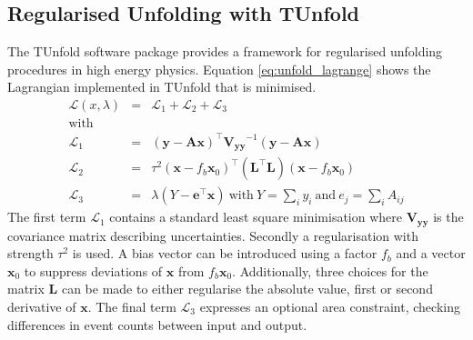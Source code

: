 \subsection{Regularised Unfolding with TUnfold}
	The TUnfold software package \cite{tunfold} provides a framework for regularised unfolding procedures in high energy physics. Equation \ref{eq:unfold_lagrange} shows the Lagrangian implemented in TUnfold that is minimised.
	\begin{eqnarray}
	\label{eq:unfold_lagrange}
	\mathcal{L}(x,\lambda) &=& \mathcal{L}_1 + \mathcal{L}_2 + \mathcal{L}_3 
	\\ \nonumber \text{with}
	\\ 
	\label{eq:unfold_lagrange1}
	\mathcal{L}_1 &=& (\mathbf{y} - \mathbf{Ax})^\intercal \mathbf{V_{yy}}^{-1} (\mathbf{y} - \mathbf{Ax}) 
	\\
	\label{eq:unfold_lagrange2}
	\mathcal{L}_2 &=& \tau^2 (\mathbf{x} - f_b \mathbf{x}_0)^\intercal (\mathbf{L}^\intercal \mathbf{L}) (\mathbf{x} - f_b \mathbf{x}_0) 
	\\
	\label{eq:unfold_lagrange3}
	\mathcal{L}_3 &=& \lambda (Y-\mathbf{e}^\intercal \mathbf{x}) \ \text{with} \ Y=\sum_{i} y_i \ \text{and} \ e_j = \sum_{i}A_{ij}
	\end{eqnarray}
	The first term $\mathcal{L}_1$ contains a standard least square minimisation where $\mathbf{V_{yy}}$ is the covariance matrix describing uncertainties. Secondly a regularisation with strength $\tau^2$ is used. A bias vector can be introduced using a factor $f_b$ and a vector $\mathbf{x}_0$ to suppress deviations of $\mathbf{x}$ from $f_b\mathbf{x}_0$. Additionally, three choices for the matrix $\mathbf{L}$ can be made to either regularise the absolute value, first or second derivative of $\mathbf{x}$. The final term $\mathcal{L}_3$ expresses an optional area constraint, checking differences in event counts between input and output.
	

